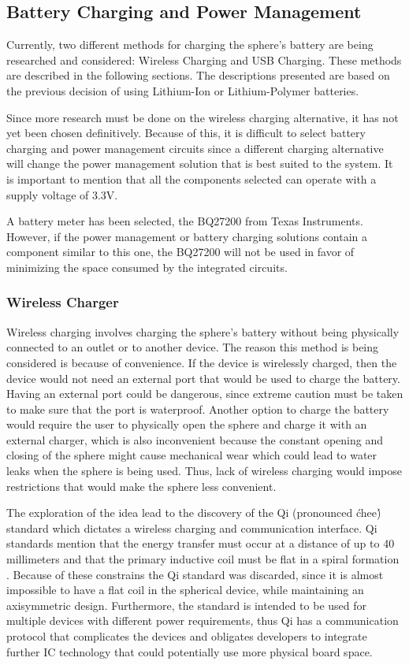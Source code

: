 \subsection{Battery Charging and Power Management}
\label{sec:chargingMethods}
Currently, two different methods for charging the sphere's battery are being researched and considered: Wireless Charging and USB Charging.  These methods are described in the following sections.  The descriptions presented are based on the previous decision of using Lithium-Ion or Lithium-Polymer batteries.

Since more research must be done on the wireless charging alternative, it has not yet been chosen definitively.  Because of this, it is difficult to select battery charging and power management circuits since a different charging alternative will change the power management solution that is best suited to the system.  It is important to mention that all the components selected can operate with a supply voltage of 3.3V.

A battery meter has been selected, the BQ27200 from Texas Instruments.  However, if the power management or battery charging solutions contain a component similar to this one, the BQ27200 will not be used in favor of minimizing the space consumed by the integrated circuits.

\subsubsection{Wireless Charger}
Wireless charging involves charging the sphere's battery without being physically connected to an outlet or to another device. The reason this method is being considered is because of convenience. If the device is wirelessly charged, then the device would not need an external port that would be used to charge the battery. Having an external port could be dangerous, since extreme caution must be taken to make sure that the port is waterproof. Another option to charge the battery would require the user to physically open the sphere and charge it with an external charger, which is also inconvenient because the constant opening and closing of the sphere might cause mechanical wear which could lead to water leaks when the sphere is being used. Thus, lack of wireless charging would impose restrictions that would make the sphere less convenient.

The exploration of the idea lead to the discovery of the Qi (pronounced \'chee\') standard which dictates a wireless charging and communication interface. Qi standards mention that the energy transfer must occur at a distance of up to 40 millimeters and that the primary inductive coil must be flat in a spiral formation \cite{QiStandard}. Because of these constrains the Qi standard was discarded, since it is almost impossible to have a flat coil in the spherical device, while maintaining an axisymmetric design. Furthermore, the standard is intended to be used for multiple devices with different power requirements, thus Qi has a communication protocol that complicates the devices and obligates developers to integrate further IC technology that could potentially use more physical board space. 

